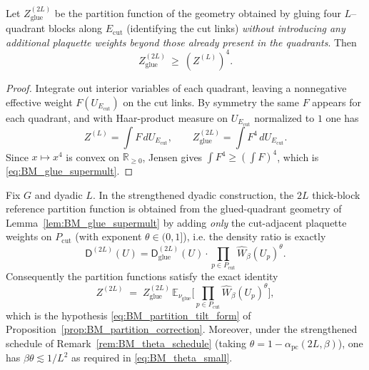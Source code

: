 \begin{lemma}\label{lem:BM_glue_supermult}
Let $Z_{\mathrm{glue}}^{(2L)}$ be the partition function of the geometry obtained by gluing four $L$--quadrant blocks along $E_{\mathrm{cut}}$
(identifying the cut links) \emph{without introducing any additional plaquette weights beyond those already present in the quadrants}.
Then
\begin{equation}\label{eq:BM_glue_supermult}
Z_{\mathrm{glue}}^{(2L)} \ \ge\ (Z^{(L)})^4.
\end{equation}
\end{lemma}
\begin{proof}
Integrate out interior variables of each quadrant, leaving a nonnegative effective weight $F(U_{E_{\mathrm{cut}}})$ on the cut links.
By symmetry the same $F$ appears for each quadrant, and with Haar-product measure on $U_{E_{\mathrm{cut}}}$ normalized to $1$ one has
\[
Z^{(L)}=\int F\,dU_{E_{\mathrm{cut}}},
\qquad
Z_{\mathrm{glue}}^{(2L)}=\int F^4\,dU_{E_{\mathrm{cut}}}.
\]
Since $x\mapsto x^4$ is convex on $\mathbb R_{\ge 0}$, Jensen gives $\int F^4\ge (\int F)^4$, which is \eqref{eq:BM_glue_supermult}.
\end{proof}


\begin{lemma}\label{lem:BM_tilt_form_G}
Fix $G$ and dyadic $L$.
In the strengthened dyadic construction, the $2L$ thick-block reference partition function is obtained from the glued-quadrant geometry
of Lemma~\ref{lem:BM_glue_supermult} by adding \emph{only} the cut-adjacent plaquette weights on $P_{\mathrm{cut}}$
(with exponent $\theta\in(0,1]$), i.e. the density ratio is exactly
\begin{equation}\label{eq:BM_tilt_form_G}
\mathsf D^{(2L)}(U)
=\mathsf D^{(2L)}_{\mathrm{glue}}(U)\cdot \prod_{p\in P_{\mathrm{cut}}}\widehat W_\beta(U_p)^{\theta}.
\end{equation}
Consequently the partition functions satisfy the exact identity
\begin{equation}\label{eq:BM_partition_tilt_form_G}
Z^{(2L)} \;=\; Z_{\mathrm{glue}}^{(2L)}\,
\mathbb E_{\nu_{\mathrm{glue}}}\Big[\prod_{p\in P_{\mathrm{cut}}}\widehat W_\beta(U_p)^{\theta}\Big],
\end{equation}
which is the hypothesis \eqref{eq:BM_partition_tilt_form} of Proposition~\ref{prop:BM_partition_correction}.
Moreover, under the strengthened schedule of Remark~\ref{rem:BM_theta_schedule} (taking $\theta=1-\alpha_{\mathrm{pc}}(2L,\beta)$),
one has $\beta\theta\lesssim 1/L^2$ as required in \eqref{eq:BM_theta_small}.
\end{lemma}

